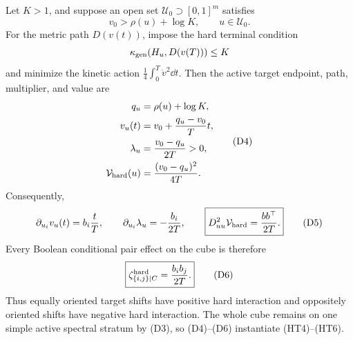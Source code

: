 \begin{theorem}
\label{thm:diag-moving-hard-target}
Let \(K>1\), and suppose an open set \(\mathcal U_0\supset[0,1]^m\)
satisfies
\begin{equation}
  v_0>\rho(u)+\log K,
  \qquad u\in\mathcal U_0.
  \tag{D3}
\end{equation}
For the metric path \(D(v(t))\), impose the hard terminal condition
\[
  \kappa_{\rm gen}(H_u,D(v(T)))\le K
\]
and minimize the kinetic action \(\frac14\int_0^T\dot v^2\dd t\).  Then the
active target endpoint, path, multiplier, and value are
\begin{equation}
\begin{aligned}
  q_u&=\rho(u)+\log K,\\
  v_u(t)&=v_0+\frac{q_u-v_0}{T}t,\\
  \lambda_u&=\frac{v_0-q_u}{2T}>0,\\
  \mathcal V_{\rm hard}(u)&=\frac{(v_0-q_u)^2}{4T}.
\end{aligned}
\tag{D4}
\end{equation}
Consequently,
\begin{equation}
  \partial_{u_i}v_u(t)=b_i\frac{t}{T},
  \qquad
  \partial_{u_i}\lambda_u=-\frac{b_i}{2T},
  \qquad
  \boxed{D_{uu}^2\mathcal V_{\rm hard}=\frac{bb^\top}{2T}.}
  \tag{D5}
\end{equation}
Every Boolean conditional pair effect on the cube is therefore
\begin{equation}
  \boxed{\zeta_{\{i,j\}\mid C}^{\rm hard}=\frac{b_i b_j}{2T}.}
  \tag{D6}
\end{equation}
Thus equally oriented target shifts have positive hard interaction and
oppositely oriented shifts have negative hard interaction.  The whole cube
remains on one simple active spectral stratum by \textup{(D3)}, so
\textup{(D4)}--\textup{(D6)} instantiate \textup{(HT4)}--\textup{(HT6)}.
\end{theorem}

\FloatBarrier

